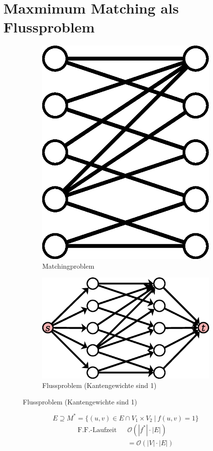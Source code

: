 \section{Maxmimum Matching als Flussproblem}
\begin{figure}[H]
	\begin{subfigure}[H]{0.4\linewidth}
		\centering
		\includegraphics[width=0.5\linewidth]{27/Grafik/Diagramm4}
		\caption{Matchingproblem}
		\label{fig:Diagramm4}
	\end{subfigure}
	\begin{subfigure}[H]{0.4\linewidth}
		\centering
		\includegraphics[width=\linewidth]{27/Grafik/Diagramm5}
		\caption{Flussproblem (Kantengewichte sind 1)}
		\label{fig:Diagramm5}
	\end{subfigure}
\end{figure}
\[ E \supseteq M^* = \{ (u,v)\in E \cap V_1\times V_2 ~|~ f(u,v) = 1 \} \]
\begin{align*}
\text{F.F.-Laufzeit }~~ &\mathcal{O}(|f^*|\cdot|E|)\\
&=\mathcal{O}(|V|\cdot|E|)
\end{align*}

